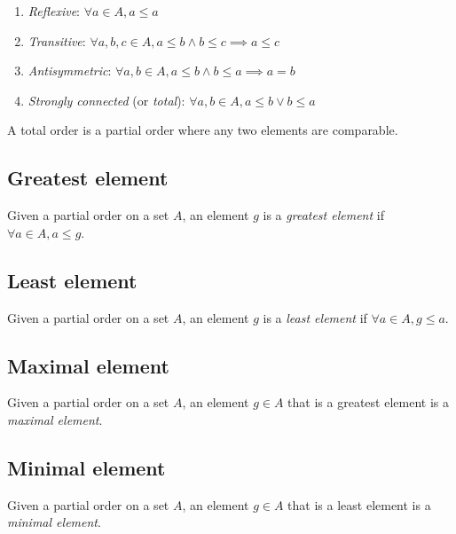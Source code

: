 \documentclass{article}
\begin{document}
\begin{enumerate}
    \item \textit{Reflexive}: \(\forall a \in A, a \leq a\)
    \item \textit{Transitive}: \(\forall a,b,c \in A, a \leq b \land b \leq c \implies a \leq c\)
    \item \textit{Antisymmetric}: \(\forall a,b \in A, a \leq b \land b \leq a \implies a=b\)
    \item \textit{Strongly connected} (or \textit{total}): \(\forall a,b\in A, a \leq b \lor b\leq a\)
\end{enumerate}

A total order is a partial order where any two elements are comparable.

\subsection{Greatest element}

Given a partial order on a set \(A\), an element \(g\) is a \textit{greatest element}
if \(\forall a\in A, a \leq g\).

\subsection{Least element}

Given a partial order on a set \(A\), an element \(g\) is a \textit{least element}
if \(\forall a\in A, g \leq a\).

\subsection{Maximal element}

Given a partial order on a set \(A\), an element \(g\in A\) that is
a greatest element is a \textit{maximal element}.

\subsection{Minimal element}

Given a partial order on a set \(A\), an element \(g\in A\) that is
a least element is a \textit{minimal element}.

\pagebreak
\end{document}
